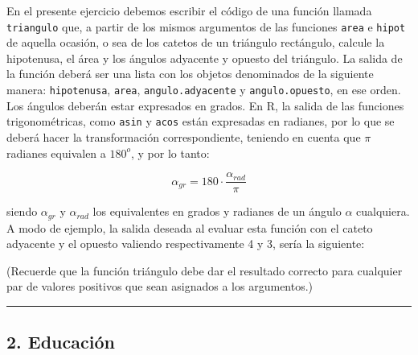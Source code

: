 \documentclass[]{article}
\newenvironment{Shaded}{}{}
\newcommand{\KeywordTok}[1]{\textcolor[rgb]{0.00,0.44,0.13}{\textbf{{#1}}}}
\newcommand{\DecValTok}[1]{\textcolor[rgb]{0.25,0.63,0.44}{{#1}}}
\newcommand{\FloatTok}[1]{\textcolor[rgb]{0.25,0.63,0.44}{{#1}}}
\newcommand{\NormalTok}[1]{{#1}}
\begin{document}
En el presente ejercicio debemos escribir el código de una función
llamada \texttt{triangulo} que, a partir de los mismos argumentos de las
funciones \texttt{area} e \texttt{hipot} de aquella ocasión, o sea de
los catetos de un triángulo rectángulo, calcule la hipotenusa, el área y
los ángulos adyacente y opuesto del triángulo. La salida de la función
deberá ser una lista con los objetos denominados de la siguiente manera:
\texttt{hipotenusa}, \texttt{area}, \texttt{angulo.adyacente} y
\texttt{angulo.opuesto}, en ese orden. Los ángulos deberán estar
expresados en grados. En R, la salida de las funciones trigonométricas,
como \texttt{asin} y \texttt{acos} están expresadas en radianes, por lo
que se deberá hacer la transformación correspondiente, teniendo en
cuenta que $\pi$ radianes equivalen a $180^o$, y por lo tanto:

\[
  \alpha_{gr} = 180 \cdot \frac{\alpha_{rad}}{\pi}
\]

siendo $\alpha_{gr}$ y $\alpha_{rad}$ los equivalentes en grados y
radianes de un ángulo $\alpha$ cualquiera. A modo de ejemplo, la salida
deseada al evaluar esta función con el cateto adyacente y el opuesto
valiendo respectivamente 4 y 3, sería la siguiente:

\begin{Shaded}
\end{Shaded}
(Recuerde que la función triángulo debe dar el resultado correcto para
cualquier par de valores positivos que sean asignados a los argumentos.)

\begin{center}\rule{3in}{0.4pt}\end{center}

\subsection{2. Educación}
\end{document}
